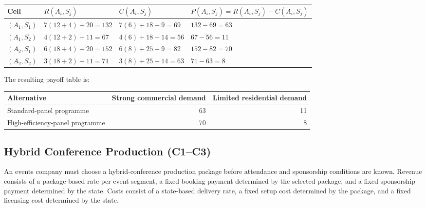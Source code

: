 \begin{center}
	\small
	\begin{tabular}{llll}
		\toprule
		Cell
		& \(R(A_i,S_j)\)
		& \(C(A_i,S_j)\)
		& \(P(A_i,S_j)=R(A_i,S_j)-C(A_i,S_j)\) \\
		\midrule
		\((A_1,S_1)\)
		& \(7(12+4)+20=132\)
		& \(7(6)+18+9=69\)
		& \(132-69=63\) \\
		
		\((A_1,S_2)\)
		& \(4(12+2)+11=67\)
		& \(4(6)+18+14=56\)
		& \(67-56=11\) \\
		
		\((A_2,S_1)\)
		& \(6(18+4)+20=152\)
		& \(6(8)+25+9=82\)
		& \(152-82=70\) \\
		
		\((A_2,S_2)\)
		& \(3(18+2)+11=71\)
		& \(3(8)+25+14=63\)
		& \(71-63=8\) \\
		\bottomrule
	\end{tabular}
\end{center}

The resulting payoff table is:

\begin{center}
	\begin{tabular}{lrr}
		\toprule
		Alternative
		& Strong commercial demand
		& Limited residential demand \\
		\midrule
		Standard-panel programme & 63 & 11 \\
		High-efficiency-panel programme & 70 & 8 \\
		\bottomrule
	\end{tabular}
\end{center}


\subsection{Hybrid Conference Production (C1--C3)}
\label{sec:problem17-hybrid-conference-production-c1-c3}

An events company must choose a hybrid-conference production package before
attendance and sponsorship conditions are known. Revenue consists of a
package-based rate per event segment, a fixed booking payment determined by
the selected package, and a fixed sponsorship payment determined by the
state. Costs consist of a state-based delivery rate, a fixed setup cost
determined by the package, and a fixed licensing cost determined by the
state.

